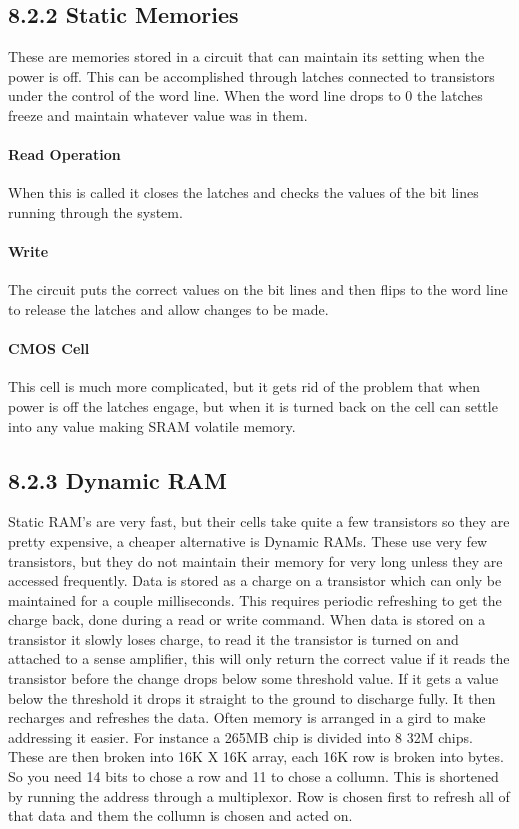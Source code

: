 \documentclass[12pt]{article}
\begin{document}
\subsection*{8.2.2 Static Memories}
These are memories stored in a circuit that can maintain its setting when the power is off. This can be accomplished through latches connected to transistors under the control of the word line. When the word line drops to 0 the latches freeze and maintain whatever value was in them. 
\paragraph*{Read Operation} When this is called it closes the latches and checks the values of the bit lines running through the system.
\paragraph*{Write} The circuit puts the correct values on the bit lines and then flips to the word line to release the latches and allow changes to be made. 
\paragraph*{CMOS Cell} This cell is much more complicated, but it gets rid of the problem that when power is off the latches engage, but when it is turned back on the cell can settle into any value making SRAM volatile memory.
\subsection*{8.2.3 Dynamic RAM}
Static RAM's are very fast, but their cells take  quite a few transistors so they are pretty expensive, a cheaper alternative is Dynamic RAMs. These use very few transistors, but they do not maintain their memory for very long unless they are accessed frequently. Data is stored as a charge on a transistor which can only be maintained for a couple milliseconds. This requires periodic refreshing to get the charge back, done during a read or write command. When data is stored on a transistor it slowly loses charge, to read it the transistor is turned on and attached to a sense amplifier, this will only return the correct value if it reads the transistor before the change drops below some threshold value. If it gets a value below the threshold it drops it straight to the ground to discharge fully. It then recharges and refreshes the data. Often memory is arranged in a gird to make addressing it easier. For instance a 265MB chip is divided into 8 32M chips. These are then broken into 16K X 16K array, each 16K row is broken into bytes. So you need 14 bits to chose a row and 11 to chose a collumn. This is shortened by running the address through a multiplexor. Row is chosen first to refresh all of that data and them the collumn is chosen and acted on. 
\end{document}

